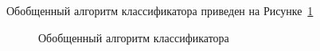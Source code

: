 Обобщенный алгоритм классификатора приведен на Рисунке~\cref{fig:commonclassificator}

\begin{figure}[ht]
    \caption{Обобщенный алгоритм классификатора }\label{fig:commonclassificator}
\end{figure}


